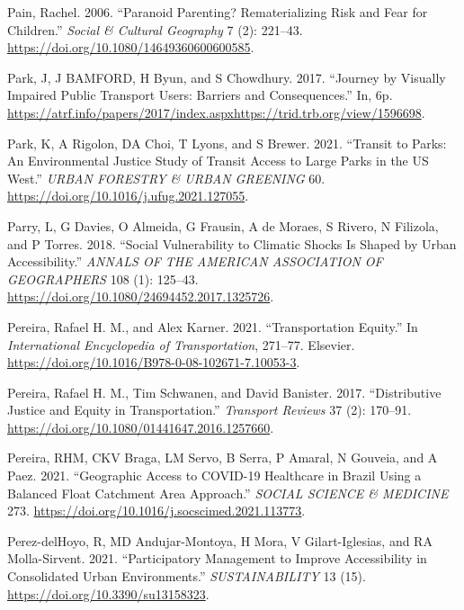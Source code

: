 \documentclass[12pt, oneside]{report}
\newlength{\cslhangindent}
\newlength{\cslentryspacingunit} %
\newenvironment{CSLReferences}[2] %
 {%
  \setlength{\parindent}{0pt}
  \ifodd #1
  \let\oldpar\par
  \def\par{\hangindent=\cslhangindent\oldpar}
  \fi
  \setlength{\parskip}{#2\cslentryspacingunit}
 }%
 {}
\begin{document}
\begin{CSLReferences}{1}{0}
\leavevmode{}%
Pain, Rachel. 2006. {``Paranoid Parenting? Rematerializing Risk and Fear
for Children.''} \emph{Social \& Cultural Geography} 7 (2): 221--43.
\url{https://doi.org/10.1080/14649360600600585}.

\leavevmode{}%
Park, J, J BAMFORD, H Byun, and S Chowdhury. 2017. {``Journey by
Visually Impaired Public Transport Users: {Barriers} and
Consequences.''} In, 6p.
\url{https://atrf.info/papers/2017/index.aspxhttps://trid.trb.org/view/1596698}.

\leavevmode{}%
Park, K, A Rigolon, DA Choi, T Lyons, and S Brewer. 2021. {``Transit to
Parks: {An} Environmental Justice Study of Transit Access to Large Parks
in the {US West}.''} \emph{URBAN FORESTRY \& URBAN GREENING} 60.
\url{https://doi.org/10.1016/j.ufug.2021.127055}.

\leavevmode{}%
Parry, L, G Davies, O Almeida, G Frausin, A de Moraes, S Rivero, N
Filizola, and P Torres. 2018. {``Social {Vulnerability} to {Climatic
Shocks Is Shaped} by {Urban Accessibility}.''} \emph{ANNALS OF THE
AMERICAN ASSOCIATION OF GEOGRAPHERS} 108 (1): 125--43.
\url{https://doi.org/10.1080/24694452.2017.1325726}.

\leavevmode{}%
Pereira, Rafael H. M., and Alex Karner. 2021. {``Transportation
{Equity}.''} In \emph{International {Encyclopedia} of {Transportation}},
271--77. {Elsevier}.
\url{https://doi.org/10.1016/B978-0-08-102671-7.10053-3}.

\leavevmode{}%
Pereira, Rafael H. M., Tim Schwanen, and David Banister. 2017.
{``Distributive Justice and Equity in Transportation.''} \emph{Transport
Reviews} 37 (2): 170--91.
\url{https://doi.org/10.1080/01441647.2016.1257660}.

\leavevmode{}%
Pereira, RHM, CKV Braga, LM Servo, B Serra, P Amaral, N Gouveia, and A
Paez. 2021. {``Geographic Access to {COVID-19} Healthcare in {Brazil}
Using a Balanced Float Catchment Area Approach.''} \emph{SOCIAL SCIENCE
\& MEDICINE} 273. \url{https://doi.org/10.1016/j.socscimed.2021.113773}.

\leavevmode{}%
Perez-delHoyo, R, MD Andujar-Montoya, H Mora, V Gilart-Iglesias, and RA
Molla-Sirvent. 2021. {``Participatory {Management} to {Improve
Accessibility} in {Consolidated Urban Environments}.''}
\emph{SUSTAINABILITY} 13 (15). \url{https://doi.org/10.3390/su13158323}.


\end{CSLReferences}
\end{document}
